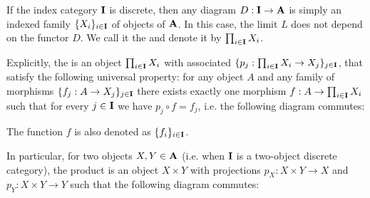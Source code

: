 \begin{definition}\label{def:categorical_product}\cite[definition 5.1.1, 5.1.7]{Leinster2014}
  If the index category \( \operatorname{\mathbf{I}} \) is discrete, then any diagram \( D: \operatorname{\mathbf{I}} \to \operatorname{\mathbf{A}} \) is simply an indexed family \( \{ X_i \}_{i \in \operatorname{\mathbf{I}}} \) of objects of \( \operatorname{\mathbf{A}} \). In this case, the limit \( L \) does not depend on the functor \( D \). We call it the  and denote it by \( \prod_{i \in \operatorname{\mathbf{I}}} X_i \).

  Explicitly, the  is an object \( \prod_{i \in \operatorname{\mathbf{I}}} X_i \) with associated  \( \{ p_j: \prod_{i \in \operatorname{\mathbf{I}}} X_i \to X_j \}_{j \in \operatorname{\mathbf{I}}} \), that satisfy the following universal property: for any object \( A \) and any family of morphisms \( \{ f_j: A \to {X_j} \}_{j \in \operatorname{\mathbf{I}}} \) there exists exactly one morphism \( f: A \to \prod_{i \in \operatorname{\mathbf{I}}} X_i \) such that for every \( j \in \operatorname{\mathbf{I}} \) we have \( p_j \circ f = f_j \), i.e. the following diagram commutes:
  \begin{Center}
  \end{Center}

  The function \( f \) is also denoted as \( \{ f_i \}_{i \in \operatorname{\mathbf{I}}} \).

  In particular, for two objects \( X, Y \in \operatorname{\mathbf{A}} \) (i.e. when \( \operatorname{\mathbf{I}} \) is a two-object discrete category), the product is an object \( X \times Y \) with projections \( p_X: X \times Y \to X \) and \( p_Y: X \times Y \to Y \) such that the following diagram commutes:
  \begin{Center}
  \end{Center}
\end{definition}

